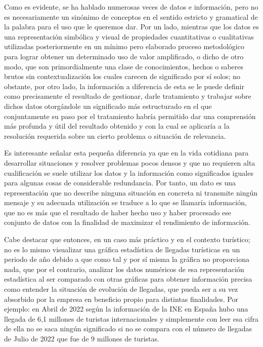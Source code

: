 \documentclass[
  letterpaper,
  DIV=11,
  numbers=noendperiod]{scrreprt}
\begin{document}
Como es evidente, se ha hablado numerosas veces de datos e información,
pero no es necesariamente un sinónimo de conceptos en el sentido
estricto y gramatical de la palabra para el uso que le queremos dar. Por
un lado, mientras que los datos es una representación simbólica y visual
de propiedades cuantitativas o cualitativas utilizadas posteriormente en
un mínimo pero elaborado proceso metodológico para lograr obtener un
determinado uso de valor amplificado, o dicho de otro modo, que son
primordialmente una clase de conocimientos, hechos o saberes brutos sin
contextualización los cuales carecen de significado por sí solos; no
obstante, por otro lado, la información a diferencia de esta se le puede
definir como precisamente el resultado de gestionar, darle tratamiento y
trabajar sobre dichos datos otorgándole un significado más estructurado
en el que conjuntamente su paso por el tratamiento habría permitido dar
una comprensión más profunda y útil del resultado obtenido y con la cual
se aplicaría a la resolución requerida sobre un cierto problema o
situación de relevancia.

Es interesante señalar esta pequeña diferencia ya que en la vida
cotidiana para desarrollar situaciones y resolver problemas pocos densos
y que no requieren alta cualificación se suele utilizar los datos y la
información como significados iguales para algunas cosas de considerable
redundancia. Por tanto, un dato es una representación que no describe
ninguna situación en concreta ni transmite ningún mensaje y su adecuada
utilización se traduce a lo que se llamaría información, que no es más
que el resultado de haber hecho uso y haber procesado ese conjunto de
datos con la finalidad de maximizar el rendimiento de información.

Cabe destacar que entonces, en un caso más práctico y en el contexto
turístico; no es lo mismo visualizar una gráfica estadística de llegadas
turísticas en un periodo de año debido a que como tal y por sí misma la
gráfica no proporciona nada, que por el contrario, analizar los datos
numéricos de esa representación estadística al ser comparado con otras
gráficas para obtener información precisa como entender la situación de
evolución de llegadas, que pueda ser a su vez absorbido por la empresa
en beneficio propio para distintas finalidades. Por ejemplo: en Abril de
2022 según la información de la INE en España hubo una llegada de 6,1
millones de turistas internacionales y simplemente con leer esa cifra de
ella no se saca ningún significado si no se compara con el número de
llegadas de Julio de 2022 que fue de 9 millones de turistas.
\end{document}
